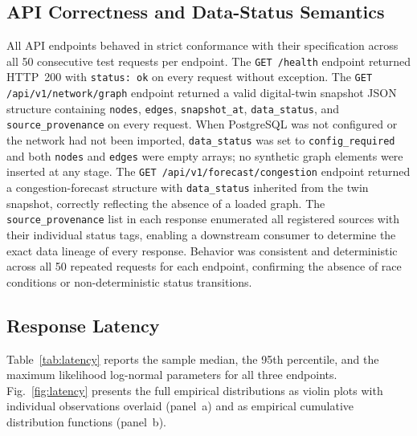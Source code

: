 
\subsection{API Correctness and Data-Status Semantics}

All API endpoints behaved in strict conformance with their specification
across all 50 consecutive test requests per endpoint.
The \texttt{GET /health} endpoint returned HTTP~200 with
\texttt{status: ok} on every request without exception.
The \texttt{GET /api/v1/network/graph} endpoint returned a valid digital-twin
snapshot JSON structure containing \texttt{nodes}, \texttt{edges},
\texttt{snapshot\_at}, \texttt{data\_status}, and
\texttt{source\_provenance} on every request.
When PostgreSQL was not configured or the network had not been imported,
\texttt{data\_status} was set to \texttt{config\_required} and
both \texttt{nodes} and \texttt{edges} were empty arrays; no synthetic
graph elements were inserted at any stage.
The \texttt{GET /api/v1/forecast/congestion} endpoint returned a
congestion-forecast structure with \texttt{data\_status} inherited from
the twin snapshot, correctly reflecting the absence of a loaded graph.
The \texttt{source\_provenance} list in each response enumerated all
registered sources with their individual status tags, enabling a downstream
consumer to determine the exact data lineage of every response.
Behavior was consistent and deterministic across all 50 repeated requests
for each endpoint, confirming the absence of race conditions or
non-deterministic status transitions.

\subsection{Response Latency}

Table~\ref{tab:latency} reports the sample median, the 95th percentile,
and the maximum likelihood log-normal parameters for all three endpoints.
Fig.~\ref{fig:latency} presents the full empirical distributions as
violin plots with individual observations overlaid (panel~a) and as
empirical cumulative distribution functions (panel~b).

